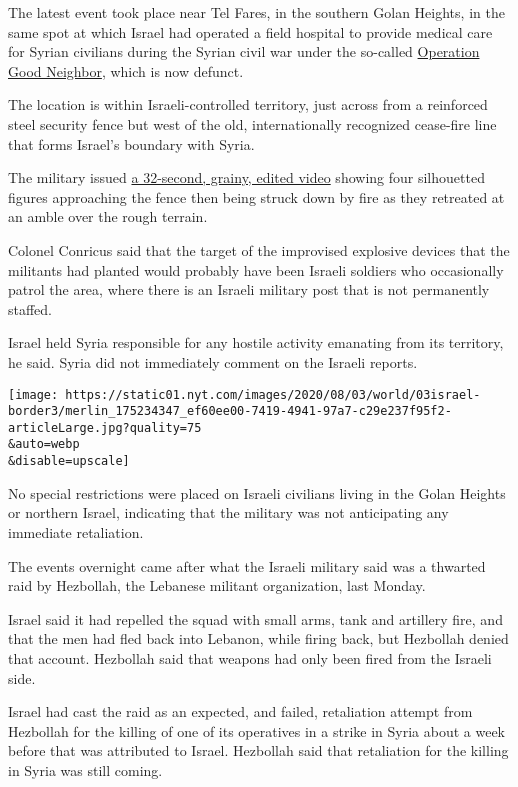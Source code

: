 The latest event took place near Tel Fares, in the southern Golan
Heights, in the same spot at which Israel had operated a field hospital
to provide medical care for Syrian civilians during the Syrian civil war
under the so-called
\href{https://www.nytimes.com/2017/07/20/world/middleeast/israel-syria-humanitarian-aid.html}{Operation
Good Neighbor}, which is now defunct.

The location is within Israeli-controlled territory, just across from a
reinforced steel security fence but west of the old, internationally
recognized cease-fire line that forms Israel's boundary with Syria.

The military issued
\href{https://spokesperson.gincher.net/releases/gZ61jQcawD3d1zbmZg-4-}{a
32-second, grainy, edited video} showing four silhouetted figures
approaching the fence then being struck down by fire as they retreated
at an amble over the rough terrain.

Colonel Conricus said that the target of the improvised explosive
devices that the militants had planted would probably have been Israeli
soldiers who occasionally patrol the area, where there is an Israeli
military post that is not permanently staffed.

Israel held Syria responsible for any hostile activity emanating from
its territory, he said. Syria did not immediately comment on the Israeli
reports.

\texttt{[image: https://static01.nyt.com/images/2020/08/03/world/03israel-border3/merlin\_175234347\_ef60ee00-7419-4941-97a7-c29e237f95f2-articleLarge.jpg?quality=75\\\&auto=webp\\\&disable=upscale]}

No special restrictions were placed on Israeli civilians living in the
Golan Heights or northern Israel, indicating that the military was not
anticipating any immediate retaliation.

The events overnight came after what the Israeli military said was a
thwarted raid by Hezbollah, the Lebanese militant organization, last
Monday.

Israel said it had repelled the squad with small arms, tank and
artillery fire, and that the men had fled back into Lebanon, while
firing back, but Hezbollah denied that account. Hezbollah said that
weapons had only been fired from the Israeli side.

Israel had cast the raid as an expected, and failed, retaliation attempt
from Hezbollah for the killing of one of its operatives in a strike in
Syria about a week before that was attributed to Israel. Hezbollah said
that retaliation for the killing in Syria was still coming.


